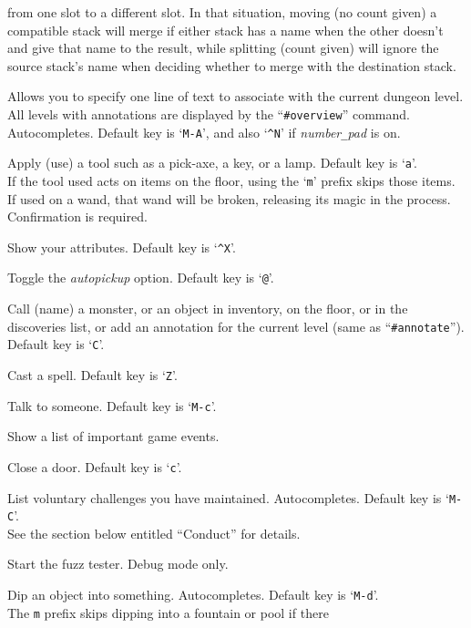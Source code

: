 from one slot to a different slot.  In that situation, moving (no
count given) a compatible stack will merge if either stack has a
name when the other doesn't and give that name to the result, while
splitting (count given) will ignore the source stack's name when
deciding whether to merge with the destination stack.
\item[\tb{\#annotate}]
Allows you to specify one line of text to associate with the current
dungeon level.  All levels with annotations are displayed by the
``{\tt \#overview}'' command. Autocompletes.
Default key is `{\tt M-A}',
and also `{\tt \^{}N}' if {\it number\verb+_+pad\/} is on.
\item[\tb{\#apply}]
Apply (use) a tool such as a pick-axe, a key, or a lamp.
Default key is `{\tt a}'.\\
If the tool used acts on items on the floor, using the `{\tt m}' prefix
skips those items.\\
If used on a wand, that wand will be broken, releasing its magic in the
process.  Confirmation is required.
\item[\tb{\#attributes}]
Show your attributes. Default key is `{\tt \^{}X}'.
\item[\tb{\#autopickup}]
Toggle the {\it autopickup\/} option. Default key is `{\tt @}'.
\item[\tb{\#call}]
Call (name) a monster, or an object in inventory, on the floor,
or in the discoveries list, or add an annotation for the
current level (same as ``{\tt \#annotate}''). Default key is `{\tt C}'.
\item[\tb{\#cast}]
Cast a spell. Default key is `{\tt Z}'.
\item[\tb{\#chat}]
Talk to someone. Default key is `{\tt M-c}'.
\item[\tb{\#chronicle}]
Show a list of important game events.
\item[\tb{\#close}]
Close a door. Default key is `{\tt c}'.
\item[\tb{\#conduct}]
List voluntary challenges you have maintained. Autocompletes.
Default key is `{\tt M-C}'.\\
See the section below entitled ``Conduct'' for details.
\item[\tb{\#debugfuzzer}]
Start the fuzz tester.
Debug mode only.
\item[\tb{\#dip}]
Dip an object into something. Autocompletes. Default key is `{\tt M-d}'.\\
The {\tt m} prefix skips dipping into a fountain or pool if there
